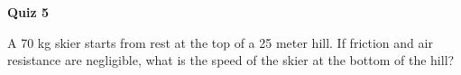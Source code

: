 \documentclass{article}
\begin{document}
\fancyfoot[C]{\thepage}
\vspace*{0cm}
\begin{center}
	{\LARGE \textbf{Quiz 5}}
\end{center}
A 70 kg skier starts from rest at the top of a 25 meter hill. If friction and air resistance are negligible, what is the speed of the skier at the bottom of the hill?
\end{document}
